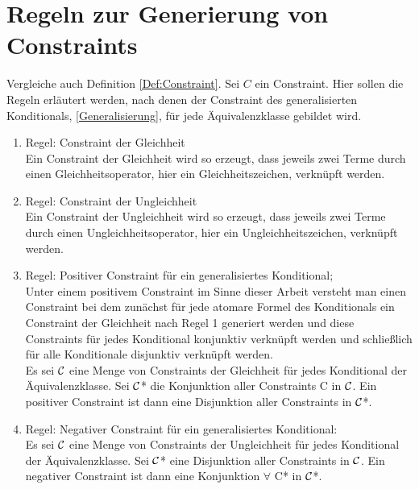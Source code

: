 \documentclass[a4paper, 11pt]{book}
\begin{document}
\section{Regeln zur Generierung von Constraints}\label{Reg} 
Vergleiche auch Definition \ref{Def:Constraint}.
Sei $ C $ ein Constraint. Hier sollen die Regeln erläutert werden, nach denen der Constraint des generalisierten Konditionals, \ref{Generalisierung}, für jede Äquivalenzklasse gebildet wird.  
\begin{enumerate}
	\item \label{Reg1} Regel: Constraint der Gleichheit\\
	Ein Constraint der Gleichheit wird so erzeugt, dass jeweils zwei Terme durch einen Gleichheitsoperator, hier ein Gleichheitszeichen, verknüpft werden.
	
	\item \label{Reg2} Regel: Constraint der Ungleichheit\\
		Ein Constraint der Ungleichheit wird so erzeugt, dass jeweils zwei Terme durch einen Ungleichheitsoperator, hier ein Ungleichheitszeichen, verknüpft werden.
	
	\item \label{Reg3} Regel: Positiver Constraint für ein generalisiertes Konditional;\\
	Unter einem positivem Constraint im Sinne dieser Arbeit versteht man einen Constraint bei dem zunächst für jede atomare Formel des Konditionals ein Constraint der Gleichheit nach Regel 1 generiert werden und diese Constraints für jedes Konditional konjunktiv verknüpft werden und schließlich für alle Konditionale disjunktiv verknüpft werden.\\
	Es sei $ \cal {C} $ eine Menge von Constraints der Gleichheit für jedes Konditional der Äquivalenzklasse. Sei $ \cal{C} $* die Konjunktion aller Constraints  C in $\cal {C}  $. Ein positiver Constraint ist dann eine Disjunktion aller Constraints in $ \cal{C} $*.
	
	\item \label{Reg4} Regel: Negativer Constraint für ein generalisiertes Konditional:\\
		Es sei $ \cal {C} $ eine Menge von Constraints der Ungleichheit für jedes Konditional der Äquivalenzklasse. Sei $ \cal{C} $* eine Disjunktion aller Constraints in $\cal {C}  $. Ein negativer Constraint ist dann eine Konjunktion $ \forall $ C* in $ \cal{C} $*.
	
	
	
\end{enumerate}
\end{document}
